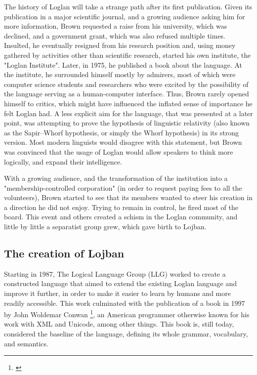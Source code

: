 The history of Loglan will take a strange path after its first publication. Given its publication in a major scientific journal, and a growing audience
asking him for more information, Brown requested a raise from his university, which was declined, and a government grant, which was also refused multiple times.
Insulted, he eventually resigned from his research position and, using money gathered by activities other than scientific research, started his own institute,
the "Loglan Institute". Later, in 1975, he published a book about the language. At the institute, he surrounded himself mostly by admirers, most of which were computer science
students and researchers who were excited by the possibility of the language serving as a human-computer interface. Thus, Brown rarely opened himself to critics,
which might have influenced the inflated sense of importance he felt Loglan had. A less explicit aim for the language, that was presented at a later point, was attempting
to prove the hypothesis of linguistic relativity (also known as the Sapir–Whorf hypothesis, or simply the Whorf hypothesis) in its strong version.
Most modern linguists would disagree with this statement, but Brown was convinced that the usage of Loglan would allow speakers to think more logically, and expand their
intelligence.\newline

With a growing audience, and the transformation of the institution into a "membership-controlled corporation" (in order to request paying fees to all the volunteers),
Brown started to see that its members wanted to steer his creation in a direction he did not enjoy. Trying to remain in control, he fired most of the board.
This event and others created a schism in the Loglan community, and little by little a separatist group grew, which gave birth to Lojban.

\subsection{The creation of Lojban}

Starting in 1987, The Logical Language Group (LLG) worked to create a constructed language that aimed to extend the existing Loglan language and improve it further,
in order to make it easier to learn by humans and more readily accessible. This work culminated with the publication of a book in 1997 by
John Woldemar Conwan \footnote{\cite{cowan1997complete}}, an American programmer otherwise known for his work with XML and Unicode, among other things. This book is,
still today, considered the baseline of the language, defining its whole grammar, vocabulary, and semantics.\newline


